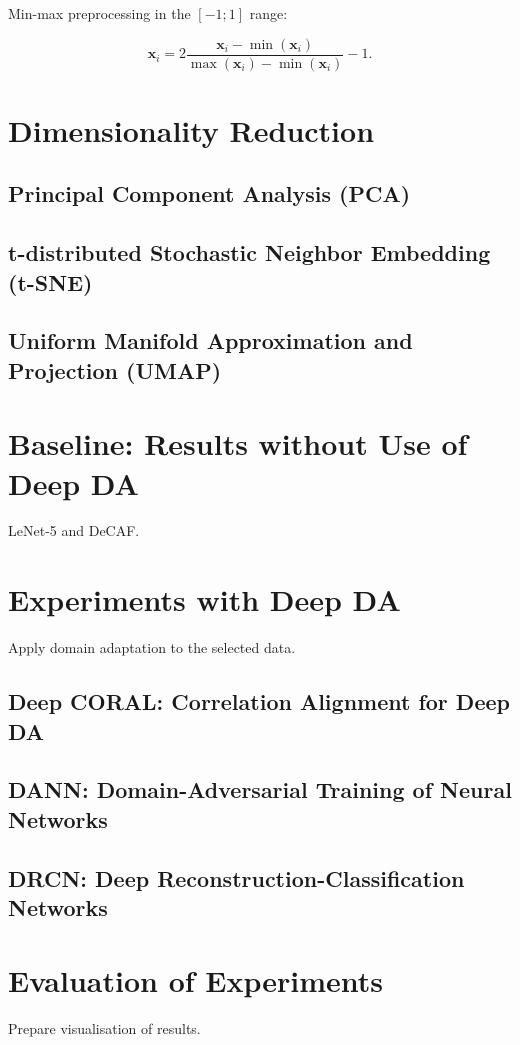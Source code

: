 Min-max preprocessing in the \([-1; 1]\) range:

\begin{equation}
	\mathbf{x}_i = 2 \frac{\mathbf{x}_i - \min(\mathbf{x}_i)}{
		\max(\mathbf{x}_i) - \min(\mathbf{x}_i)} - 1.
\end{equation}

\section{Dimensionality Reduction}

\subsection{Principal Component Analysis (PCA)}

\subsection{t-distributed Stochastic Neighbor Embedding (t-SNE)}

\subsection{Uniform Manifold Approximation and Projection (UMAP)}

\section{Baseline: Results without Use of Deep DA}

LeNet-5 and DeCAF.

\section{Experiments with Deep DA}

Apply domain adaptation to the selected data.

\subsection{Deep CORAL: Correlation Alignment for Deep DA}

\subsection{DANN: Domain-Adversarial Training of Neural Networks}

\subsection{DRCN: Deep Reconstruction-Classification Networks}

\section{Evaluation of Experiments}

Prepare visualisation of results.
